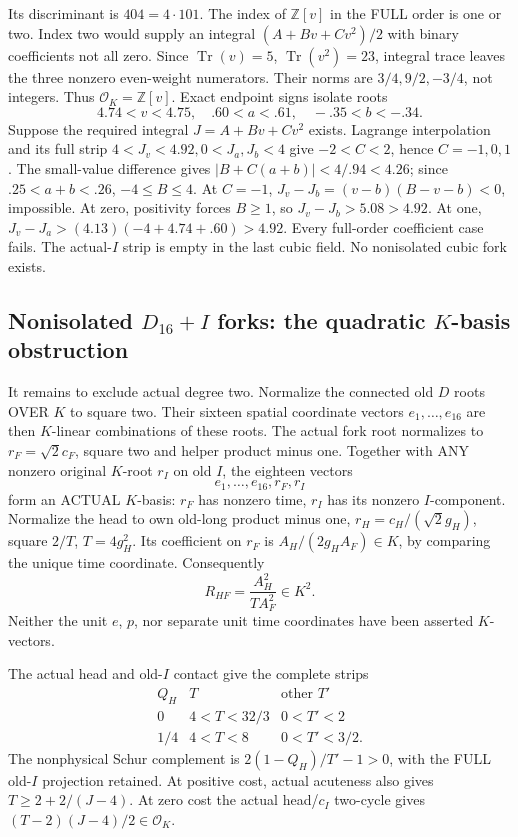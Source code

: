 \documentclass[11pt]{article}
\begin{document}
Its discriminant is \(404=4\cdot101\).
The index of \(\mathbb Z[v]\) in
the FULL order is one or two.
Index two would supply an integral
\((A+Bv+Cv^2)/2\) with binary
coefficients not all zero.
Since \(\operatorname{Tr}(v)=5\),
\(\operatorname{Tr}(v^2)=23\),
integral trace leaves the three nonzero
even-weight numerators.
Their norms are \(3/4,9/2,-3/4\),
not integers.
Thus \(\mathcal O_K=\mathbb Z[v]\).
Exact endpoint signs isolate roots
\[
                        4.74<v<4.75,\quad .60<a<.61,\quad-.35<b<-.34 .
\]
Suppose the required integral
\(J=A+Bv+Cv^2\) exists.
Lagrange interpolation and its full
strip \(4<J_v<4.92,0<J_a,J_b<4\)
give \(-2<C<2\), hence \(C=-1,0,1\).
The small-value difference gives
\(|B+C(a+b)|<4/.94<4.26\);
since \(.25<a+b<.26\), \(-4\le B\le4\).
At \(C=-1\),
\(J_v-J_b=(v-b)(B-v-b)<0\), impossible.
At zero, positivity forces \(B\ge1\),
so \(J_v-J_b>5.08>4.92\).
At one,
\(J_v-J_a>(4.13)(-4+4.74+.60)>4.92\).
Every full-order coefficient case fails.
The actual-\(I\) strip is empty in the
last cubic field.
No nonisolated cubic fork exists.

\subsection[Nonisolated D16+I forks: the quadratic K-basis obstruction]{Nonisolated \(D_{16}+I\) forks: the quadratic \(K\)-basis obstruction}
\label{app:arithD16Inonisolatedquadratic}

It remains to exclude actual degree two.
Normalize the connected old \(D\) roots
OVER \(K\) to square two.
Their sixteen spatial coordinate vectors
\(e_1,\ldots,e_{16}\) are then
\(K\)-linear combinations of these roots.
The actual fork root normalizes to
\(r_F=\sqrt2c_F\), square two and
helper product minus one.
Together with ANY nonzero original
\(K\)-root \(r_I\) on old \(I\), the
eighteen vectors
\[
                          e_1,\ldots,e_{16},r_F,r_I
\]
form an ACTUAL \(K\)-basis:
\(r_F\) has nonzero time, \(r_I\)
has its nonzero \(I\)-component.
Normalize the head to own old-long
product minus one,
\(r_H=c_H/(\sqrt2g_H)\), square \(2/T\),
\(T=4g_H^2\).
Its coefficient on \(r_F\) is
\(A_H/(2g_HA_F)\in K\), by comparing
the unique time coordinate.
Consequently
\[
                         R_{HF}={\frac{A_H^2}{T A_F^2}}\in K^2 .
\tag{D16IHF}\label{eq:arithD16Iheadforksquare}
\]
Neither the unit \(e\), \(p\), nor
separate unit time coordinates have
been asserted \(K\)-vectors.

The actual head and old-\(I\) contact
give the complete strips
\[
\begin{array}{c|c|c}
 Q_H&T&\text{other }T'\\ \hline
0&4<T<32/3&0<T'<2\\
1/4&4<T<8&0<T'<3/2 .
\end{array}
\]
The nonphysical Schur complement is
\(2(1-Q_H)/T'-1>0\), with the FULL
old-\(I\) projection retained.
At positive cost, actual acuteness
also gives \(T\ge2+2/(J-4)\).
At zero cost the actual head/\(c_I\)
two-cycle gives
\((T-2)(J-4)/2\in\mathcal O_K\).
\end{document}
